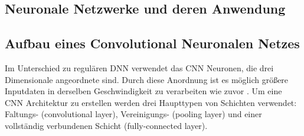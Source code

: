 \documentclass[twosided,a4,10pt]{article}
\begin{document}
\begin{multicols}{2}
		\section{Neuronale Netzwerke und deren Anwendung}
		
		\subsection{Aufbau eines Convolutional Neuronalen Netzes}
		Im Unterschied zu regulären DNN verwendet das CNN Neuronen, die drei Dimensionale angeordnete sind. Durch diese Anordnung ist es möglich größere Inputdaten in derselben Geschwindigkeit zu verarbeiten wie zuvor \cite{karpathy}. Um eine CNN Architektur zu erstellen werden drei Haupttypen von Schichten verwendet: Faltungs- (convolutional layer), Vereinigungs- (pooling layer) und einer vollständig verbundenen Schicht (fully-connected layer).
		

\end{multicols}
\end{document}
